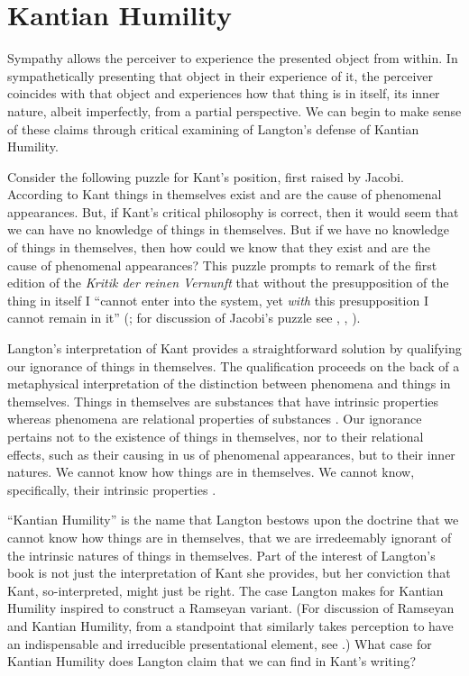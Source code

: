

\section{Kantian Humility} %
\label{sec:kantian_humility}

Sympathy allows the perceiver to experience the presented object from within. In sympathetically presenting that object in their experience of it, the perceiver coincides with that object and experiences how that thing is in itself, its inner nature, albeit imperfectly, from a partial perspective. We can begin to make sense of these claims through critical examining of Langton's \citeyearpar{Langton:1998aa} defense of Kantian Humility.

Consider the following puzzle for Kant's position, first raised by Jacobi. According to Kant things in themselves exist and are the cause of phenomenal appearances. But, if Kant's critical philosophy is correct, then it would seem that we can have no knowledge of things in themselves. But if we have no knowledge of things in themselves, then how could we know that they exist and are the cause of phenomenal appearances? This puzzle prompts \citet[304]{Jacobi:1815bs} to remark of the first edition of the \emph{Kritik der reinen Vernunft} that without the presupposition of the thing in itself I ``cannot enter into the system, yet \emph{with} this presupposition I cannot remain in it'' (\citealt[335]{Guyer:1987xe}; for discussion of Jacobi's puzzle see \citealt[247--54]{Allison:1983ly}, \citealt[chapter 15]{Guyer:1987xe}, \citealt[chapter 1]{Langton:1998aa}).

Langton's interpretation of Kant provides a straightforward solution by qualifying our ignorance of things in themselves. The qualification proceeds on the back of a metaphysical interpretation of the distinction between phenomena and things in themselves. Things in themselves are substances that have intrinsic properties whereas phenomena are relational properties of substances \citep[20]{Langton:1998aa}. Our ignorance pertains not to the existence of things in themselves, nor to their relational effects, such as their causing in us of phenomenal appearances, but to their inner natures. We cannot know how things are in themselves. We cannot know, specifically, their intrinsic properties \citep[13]{Langton:1998aa}. 

``Kantian Humility'' is the name that Langton bestows upon the doctrine that we cannot know how things are in themselves, that we are irredeemably ignorant of the intrinsic natures of things in themselves. Part of the interest of Langton's book is not just the interpretation of Kant she provides, but her conviction that Kant, so-interpreted, might just be right. The case Langton makes for Kantian Humility inspired \citet{Lewis:2009ax} to construct a Ramseyan variant. (For discussion of Ramseyan and Kantian Humility, from a standpoint that similarly takes perception to have an indispensable and irreducible presentational element, see \citealt{Brewer:2011ks}.) What case for Kantian Humility does Langton claim that we can find in Kant's writing?

